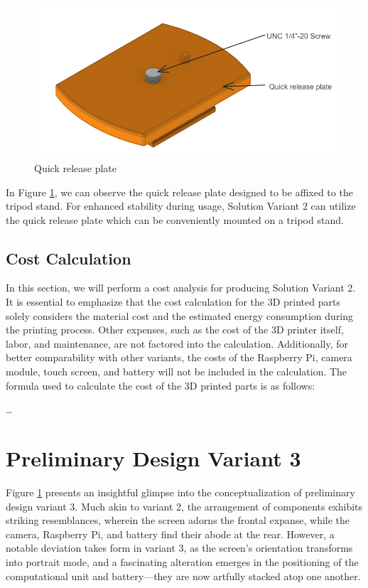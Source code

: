 \begin{figure}[ht!]
    \centering
    \includegraphics[height=5 cm]{texs/Part1/chapter4/image/v29.png}
    \caption{Quick release plate}
    \label{fig:variant2_quick_release_plate}
\end{figure}

In Figure \ref{fig:variant2_quick_release_plate}, we can observe the quick release plate designed to be affixed to the tripod stand. For enhanced stability during usage, Solution Variant 2 can utilize the quick release plate which can be conveniently mounted on a tripod stand.

\subsection{Cost Calculation}
In this section, we will perform a cost analysis for producing Solution Variant 2. It is essential to emphasize that the cost calculation for the 3D printed parts solely considers the material cost and the estimated energy consumption during the printing process. Other expenses, such as the cost of the 3D printer itself, labor, and maintenance, are not factored into the calculation. Additionally, for better comparability with other variants, the costs of the Raspberry Pi, camera module, touch screen, and battery will not be included in the calculation. The formula used to calculate the cost of the 3D printed parts is as follows:

\dots


\section{Preliminary Design Variant 3}


Figure \ref{} presents an insightful glimpse into the conceptualization of preliminary design variant 3. Much akin to variant 2, the arrangement of components exhibits striking resemblances, wherein the screen adorns the frontal expanse, while the camera, Raspberry Pi, and battery find their abode at the rear. However, a notable deviation takes form in variant 3, as the screen's orientation transforms into portrait mode, and a fascinating alteration emerges in the positioning of the computational unit and battery—they are now artfully stacked atop one another.

